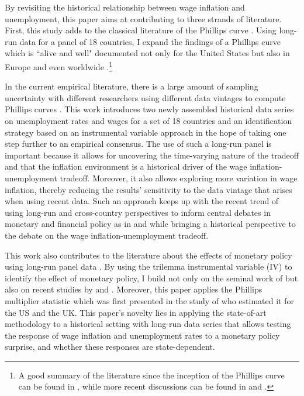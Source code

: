 \documentclass[12pt]{article}
\begin{document}
By revisiting the historical relationship between wage inflation and unemployment, this paper aims at contributing to three strands of literature. First, this study adds to the classical literature of the Phillips curve \citep{Phillips1958}. Using long-run data for a panel of 18 countries, I expand the findings of a Phillips curve which is ``alive and well" documented not only for the United States \citep{Coibion2015, Blanchard2016, Hoynck2020, DelNegro2020, Ascari2021, Hazell2021, Bergholt2023} but also in Europe \citep{Levy2019, Onorante2019, Bonam2021} and even worldwide \citep{Coibion2019}.\footnote{A good summary of the literature since the inception of the Phillips curve can be found in \cite{Gordon2011}, while more recent discussions can be found in \cite{Mavroeidis2014} and \cite{Coibion2018}.} 

In the current empirical literature, there is a large amount of sampling uncertainty with different researchers using different data vintages to compute Phillips curves \citep{Mavroeidis2014}. This work introduces two newly assembled historical data series on unemployment rates and wages for a set of 18 countries and an identification strategy based on an instrumental variable approach in the hope of taking one step further to an empirical consensus. The use of such a long-run panel is important because it allows for uncovering the time-varying nature of the tradeoff and that the inflation environment is a historical driver of the wage inflation-unemployment tradeoff. Moreover, it also allows exploring more variation in wage inflation, thereby reducing the results' sensitivity to the data vintage that arises when using recent data. Such an approach keeps up with the recent trend of using long-run and cross-country perspectives to inform central debates in monetary and financial policy as in \cite{Reinhart2009} and \cite{Schularick2012} while bringing a historical perspective to the debate on the wage inflation-unemployment tradeoff.

This work also contributes to the literature about the effects of monetary policy using long-run panel data \citep{Jorda2019, Alpanda2019}. By using the trilemma instrumental variable (IV) to identify the effect of monetary policy, I build not only on the seminal work of \cite{DiGiovanni2009} but also on recent studies by \cite{Jorda2019} and \cite{Schularick2020}. Moreover, this paper applies the Phillips multiplier statistic which was first presented in the study of \cite{Barnichon2019} who estimated it for the US and the UK. This paper's novelty lies in applying the state-of-art methodology to a historical setting with long-run data series that allows testing the response of wage inflation and unemployment rates to a monetary policy surprise, and whether these responses are state-dependent.
\end{document}
